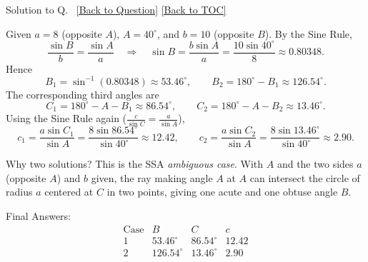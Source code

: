 \documentclass[11pt]{article}
\def\textbf#1{#1}%
\newcounter{question}
\newcounter{solutionNo} %
\newenvironment{solution}{
  \refstepcounter{solutionNo}%
  \hypertarget{sol-\thesolutionNo}{}%
  \par\noindent\textbf{Solution to Q\thesolutionNo.}~%
  \hyperlink{q-\thesolutionNo}{\small[Back to Question]}%
  \quad\hyperlink{toc}{\small[Back to TOC]}%
  \par\vspace{0.3em}%
}{\par}
\begin{document}
\begin{solution}
Given \(a=8\) (opposite \(A\)), \(A=40^\circ\), and \(b=10\) (opposite \(B\)).
By the Sine Rule,
\[
\frac{\sin B}{b}=\frac{\sin A}{a}
\quad\Longrightarrow\quad
\sin B=\frac{b\sin A}{a}
=\frac{10\sin 40^\circ}{8}\approx 0.80348.
\]
Hence
\[
B_1=\sin^{-1}(0.80348)\approx 53.46^\circ,
\qquad
B_2=180^\circ-B_1\approx 126.54^\circ.
\]
The corresponding third angles are
\[
C_1=180^\circ-A-B_1\approx 86.54^\circ,
\qquad
C_2=180^\circ-A-B_2\approx 13.46^\circ.
\]
Using the Sine Rule again (\( \tfrac{c}{\sin C}=\tfrac{a}{\sin A}\)),
\[
c_1=\frac{a\sin C_1}{\sin A}
=\frac{8\sin 86.54^\circ}{\sin 40^\circ}\approx 12.42,
\qquad
c_2=\frac{a\sin C_2}{\sin A}
=\frac{8\sin 13.46^\circ}{\sin 40^\circ}\approx 2.90.
\]

\textbf{Why two solutions?}  
This is the SSA \emph{ambiguous case}.  With \(A\) and the two sides \(a\) (opposite \(A\)) and \(b\) given, the ray making angle \(A\) at \(A\) can intersect the circle of radius \(a\) centered at \(C\) in two points, giving one acute and one obtuse angle \(B\).

\begin{center}
\end{center}

\textbf{Final Answers:}
\[
\begin{array}{c|c|c|c}
\text{Case} & B & C & c \\ \hline
1 & 53.46^\circ & 86.54^\circ & 12.42 \\
2 & 126.54^\circ & 13.46^\circ & 2.90
\end{array}
\]
\end{solution}
\end{document}
